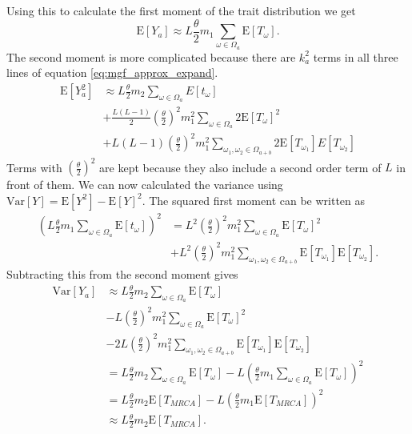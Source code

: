 \documentclass{article}
\newcommand{\T}{\frac{\theta}{2}}
\newcommand{\E}{\mathrm{E}}
\newcommand{\Var}{\mathrm{Var}}
\begin{document}
Using this to calculate the first moment of the trait distribution we get
\begin{equation}
  \label{eq:mom1}
  \E[Y_a] \approx L\T m_1 \sum_{\omega \in \Omega_a} \E[T_\omega].
\end{equation}
The second moment is more complicated because there are $k_a^2$ terms in all
three lines of equation \ref{eq:mgf_approx_expand}.
\begin{align}
  \E[Y_a^2] &\approx L\T m_2 \sum_{\omega \in \Omega_a} E[t_\omega] \nonumber \\
  &+ \frac{L(L-1)}{2} \left(\T \right)^2 m_1^2 \sum_{\omega \in \Omega_a} 2 \E[T_\omega]^2 \nonumber \\
  &+ L(L-1) \left(\T \right)^2 m_1^2 \sum_{\omega_1 , \omega_2 \in \Omega_{a+b}} 2 \E[T_{\omega_1}]E[T_{\omega_2}]
\end{align}
Terms with $(\T)^2$ are kept because they also include a second order term of
$L$ in front of them. We can now calculated the variance using $\Var[Y]=\E[Y^2] -
\E[Y]^2$. The squared first moment can be written as
\begin{align}
  \left(L\T m_1 \sum_{\omega \in \Omega_a} \E[t_\omega] \right)^2 &=
  L^2\left(\T\right)^2 m_1^2 \sum_{\omega \in \Omega_a} \E[T_\omega]^2 \nonumber \\
  &+ L^2\left(\T\right)^2 m_1^2 \sum_{\omega_1 , \omega_2 \in \Omega_{a+b}} \E[T_{\omega_1}]\E[T_{\omega_2}].
\end{align}
Subtracting this from the second moment gives
\begin{align}
  \label{eq:var}
  \Var[Y_a] &\approx L\T m_2 \sum_{\omega \in \Omega_a} \E[T_\omega] \nonumber \\
  &- L \left(\T\right)^2 m_1^2 \sum_{\omega \in \Omega_a}\E[T_\omega]^2 \nonumber \\
  &-  2L \left(\T\right)^2 m_1^2 \sum_{\omega_1 , \omega_2 \in \Omega_{a+b}} \E[T_{\omega_1}]\E[T_{\omega_2}] \nonumber \\
  &= L\T m_2 \sum_{\omega \in \Omega_a} \E[T_\omega] -
  L\left( \T m_1 \sum_{\omega \in \Omega_a} \E[T_\omega] \right)^2 \nonumber \\
  &= L\T m_2 \E[T_{MRCA}] - L\left( \T m_1 \E[T_{MRCA}] \right)^2  \\
  &\approx L\T m_2 \E[T_{MRCA}].  \nonumber
\end{align}
\end{document}
